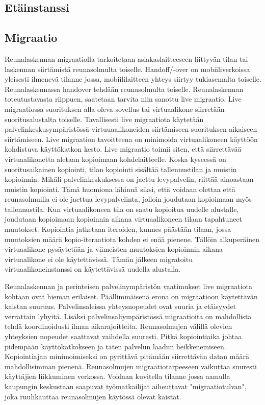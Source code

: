 \documentclass[finnish]{tktltiki2}
\theoremstyle{definition}
\theoremstyle{remark}
\begin{document}
\subsection{Etäinstanssi}
\subsection{Migraatio}
Reunalaskennan migraatiolla tarkoitetaan asiakaslaitteeseen liittyvän tilan tai laskennan siirtämistä reunasolmulta toiselle.
Handoff/-over on mobiiliverkoissa yleisesti ilmenevä tilanne jossa, mobiililaitteen yhteys siirtyy tukiasemalta toiselle.
Reunalaskennassa handover tehdään reunasolmulta toiselle. Reunalaskennan
toteutustavasta riippuen, saatetaan tarvita niin sanottu live migraatio. Live migraatiossa suorituksen alla oleva sovellus tai virtuaalikone siirretään suoritusalustalta toiselle.
Tavallisesti live migraatiota käytetään palvelinkeskusympäristössä virtuuaalikoneiden siirtämiseen suorituksen aikaiseen siirtämiseen. Live migraation tavoitteena on minimoida virtuaalikoneen käyttöön kohdistuva käyttökatkon kesto.
Live migraatio toimii siten, että siirrettävää virtuaalikonetta aletaan kopioimaan kohdelaitteelle.
Koska kyseessä on suoritusaikainen kopiointi, tilan kopiointi sisältää tallennustilan ja muistin kopioinnin.
Mikäli palvelinkeskuksessa on jaettu levypalvelin, riittää ainoastaan muistin kopiointi. Tämä huomiona lähinnä siksi, että voidaan olettaa että reunasolmuilla ei ole jaettua levypalvelinta, jolloin joudutaan kopioimaan myös tallennustila. 
Kun virtuaalikoneen tila on saatu kopioitua uudelle alustalle, joudutaan kopioimaan kopioinnin aikana virtuaalikoneen tilaan tapahtuneet muutokset.
Kopiointia jatketaan iteroiden, kunnes päästään tilaan, jossa muutoksien määrä kopio-iteraatiota kohden ei enää pienene.
Tällöin alkuperäinen virtuaalikone pysäytetään ja viimeisten muutoksien kopioinnin aikana virtuaalikone ei ole käytettävissä. Tämän jälkeen migratoitu virtuaalikoneinstanssi on käytettävissä uudella alustalla. \cite{ha2015adaptive}

Reunalaskennan ja perinteisen palvelinympäristön vaatimukset live migraatiota kohtaan ovat hieman erilaiset.
Päällimmäisenä erona on migraatioon käytettävän kaistan suuruus. Palvelinsaleissa yhteysnopeudet ovat suuria ja etäisyydet verrattain lyhyitä. Lisäksi palvelinsaliympäristössä migraatioita on mahdollista tehdä koordinoidusti ilman aikarajoitteita.
Reunasolmujen välillä olevien yhteyksien nopeudet saattavat vaihdella suuresti.
Pitkä kopiointiaika johtaa pidempään käyttökatkokseen ja täten palvelun laadun heikkenemiseen. Kopiointiajan minimoimiseksi on pyrittävä pitämään siirrettävän datan määrä mahdollisimman pienenä. Reunasolmujen migraatiotarpeeseen vaikuttaa suuresti käyttäjien liikkuminen verkossa. Voidaan kuvitella tilanne jossa aamulla kaupungin keskustaan saapuvat työmatkailijat aiheuttavat "migraatiotulvan", joka ruuhkauttaa reunasolmujen käytössä olevat kaistat.  
\end{document}
